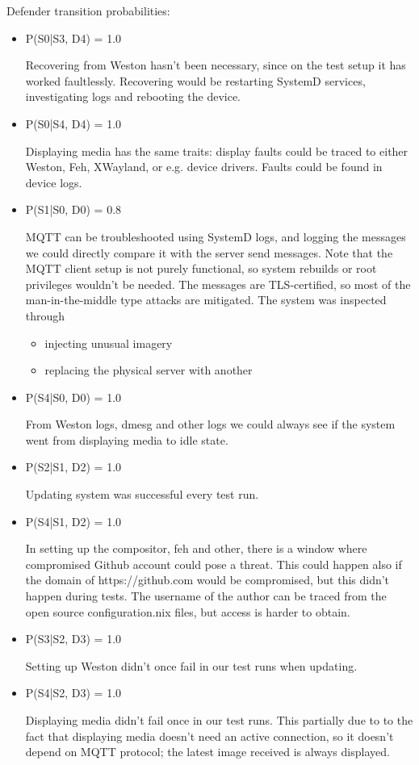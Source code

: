 Defender transition probabilities:

\begin{itemize}
\item P(S0|S3, D4) = 1.0

Recovering from Weston hasn't been necessary, since on the test setup it has worked faultlessly. Recovering would be restarting SystemD services, investigating logs and rebooting the device.
\item P(S0|S4, D4) = 1.0

Displaying media has the same traits: display faults could be traced to either Weston, Feh, XWayland, or e.g. device drivers. Faults could be found in device logs.
\item P(S1|S0, D0) = 0.8

MQTT can be troubleshooted using SystemD logs, and logging the messages we could directly compare it with the server send messages. Note that the MQTT client setup is not purely functional, so system rebuilds or root privileges wouldn't be needed. The messages are TLS-certified, so most of the man-in-the-middle type attacks are mitigated. The system was inspected through 
\begin{itemize}

\item injecting unusual imagery
\item replacing the physical server with another
\end{itemize}

\item P(S4|S0, D0) = 1.0

From Weston logs, dmesg and other logs we could always see if the system went from displaying media to idle state.

\item P(S2|S1, D2) = 1.0

Updating system was successful every test run.

\item P(S4|S1, D2) = 1.0

In setting up the compositor, feh and other, there is a window where compromised Github account could pose a threat. This could happen also if the domain of https://github.com would be compromised, but this didn't happen during tests. The username of the author can be traced from the open source configuration.nix files, but access is harder to obtain.

\item P(S3|S2, D3) = 1.0

Setting up Weston didn't once fail in our test runs when updating.

\item P(S4|S2, D3) = 1.0

Displaying media didn't fail once in our test runs. This partially due to to the fact that displaying media doesn't need an active connection, so it doesn't depend on MQTT protocol; the latest image received is always displayed.

\end{itemize}

